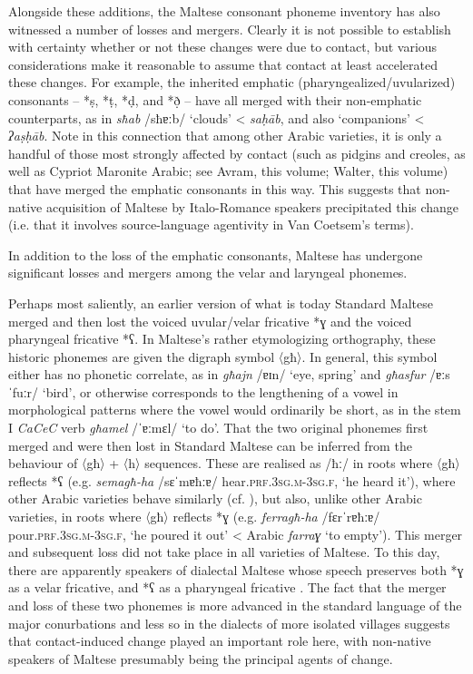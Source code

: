 \documentclass[output=paper]{langsci/langscibook}
\begin{document}
 \label{mergers}
Alongside these additions, the Maltese consonant phoneme inventory has also witnessed a number of losses and mergers. Clearly it is not possible to establish with certainty whether or not these changes were due to contact, but various considerations make it reasonable to assume that contact at least accelerated these changes. For example, the inherited emphatic (pharyngealized/uvularized) consonants -- *\d{s}, *\d{t}, *\d{d}, and *\d{ð} -- have all merged with their non-emphatic counterparts, as in \textit{sħab} /sħɐːb/ `clouds' < \textit{sa\d{h}\={a}b}, and also `companions' < \textit{ʔa\d{s}\d{h}\={a}b}. Note in this connection that among other Arabic varieties, it is only a handful of those most strongly affected by contact (such as pidgins and creoles, as well as Cypriot Maronite Arabic; see Avram, this volume; Walter, this volume) that have merged the emphatic consonants in this way. This suggests that non-native acquisition of Maltese by Italo-Romance speakers precipitated this change (i.e. that it involves source-language agentivity in Van Coetsem's \citeyear{VanCoetsem1988,VanCoetsem2000} terms).

In addition to the loss of the emphatic consonants, Maltese has undergone significant losses and mergers among the velar and laryngeal phonemes. 

Perhaps most saliently, an earlier version of what is today Standard Maltese merged and then lost the voiced uvular/velar fricative *ɣ and the voiced pharyngeal fricative *ʕ. In Maltese's rather etymologizing orthography, these historic phonemes are given the digraph symbol 〈għ〉. In general, this symbol either has no phonetic correlate, as in \textit{għajn} /ɐɪn/ `eye, spring' and \textit{għasfur} /ɐːsˈfuːr/ `bird', or otherwise corresponds to the lengthening of a vowel in morphological patterns where the vowel would ordinarily be short, as in the stem I \textit{CaCeC} verb \textit{għamel} /ˈɐːmɛl/ `to do'. That the two original phonemes first merged and were then lost in Standard Maltese can be inferred from the behaviour of 〈għ〉 + 〈h〉 sequences. These are realised as /ħː/ in roots where 〈għ〉 reflects *ʕ (e.g. \textit{semagħ-ha} /sɛˈmɐħːɐ/ hear.\textsc{prf.3sg.m-3sg.f}, `he heard it'), where other Arabic varieties behave similarly (cf. \citealt[18] {Woidich2006}), but also, unlike other Arabic varieties, in roots where 〈għ〉 reflects *ɣ (e.g. \textit{ferragħ-ha} /fɛrˈrɐħːɐ/ pour.\textsc{prf.3sg.m-3sg.f}, `he poured it out' < Arabic \textit{farraɣ} `to empty'). This merger and subsequent loss did not take place in all varieties of Maltese. To this day, there are apparently speakers of dialectal Maltese whose speech preserves both *ɣ as a velar fricative, and *ʕ as a pharyngeal fricative \citep{klimiuk2017}. The fact that the merger and loss of these two phonemes is more advanced in the standard language of the major conurbations and less so in the dialects of more isolated villages suggests that contact-induced change played an important role here, with non-native speakers of Maltese presumably being the principal agents of change. 
\end{document}
